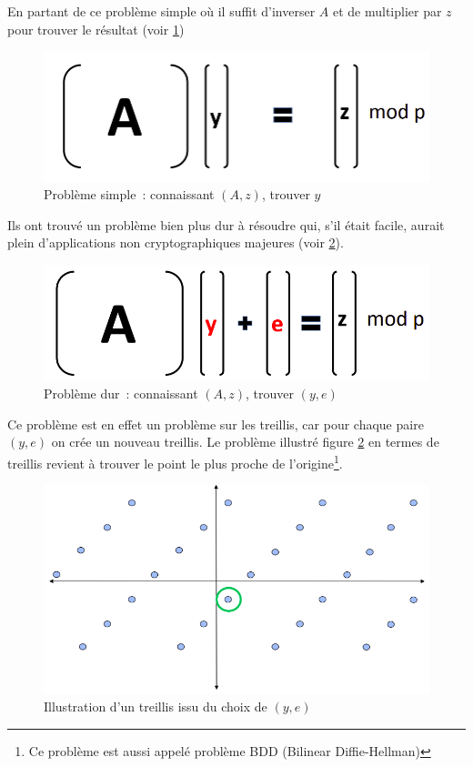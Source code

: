 \documentclass[a4paper, 12pt]{article}
\begin{document}
En partant de ce problème simple où il suffit d'inverser $A$ et de multiplier par $z$ pour trouver le résultat (voir \ref{quantsimple})
\begin{figure}[h]
	\centering
	\includegraphics[width=\textwidth]{img/quantique_simple.png}
	\caption{Problème simple : connaissant $(A, z)$, trouver $y$}
	\label{quantsimple}
\end{figure}

Ils ont trouvé un problème bien plus dur à résoudre qui, s'il était facile, aurait plein d'applications non cryptographiques majeures (voir \ref{quantdur}).
\begin{figure}[h]
	\centering
	\includegraphics[width=\textwidth]{img/quantique_dur.png}
	\caption{Problème dur : connaissant $(A, z)$, trouver $(y, e)$}
	\label{quantdur}
\end{figure}
Ce problème est en effet un problème sur les treillis, car pour chaque paire $(y,e)$ on crée un nouveau treillis. Le problème illustré figure \ref{quantdur} en termes de treillis revient à trouver le point le plus proche de l'origine\footnote{Ce problème est aussi appelé problème BDD (Bilinear Diffie-Hellman)}.
\begin{figure}[h]
	\centering
	\includegraphics[width=\textwidth]{img/treilliIlu.png}
	\caption{Illustration d'un treillis issu du choix de $(y,e)$}
	\label{treilliIlu}
\end{figure}
\end{document}
